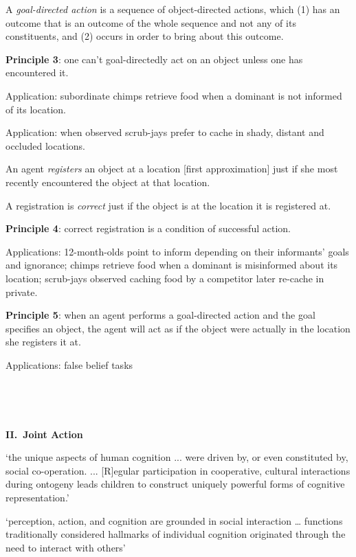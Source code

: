 \documentclass[11pt]{extarticle}
\begin{document}
\begin{multicols}{3}
A \emph{goal-directed action} is a sequence of object-directed actions, which (1) has an outcome that  is an outcome of the whole sequence and not any of its constituents, and (2) occurs in order to bring about this outcome.


\textbf{Principle 3}: one can’t goal-directedly act on an object unless one has encountered it.

Application: subordinate chimps retrieve food when a dominant is not informed of its location.\citep{Hare:2001ph}

Application: when observed scrub-jays prefer to cache in shady, distant and occluded locations.\citep{Dally:2004xf,Clayton:2007fh}

An agent \emph{registers} an object at a location [first approximation] just if she most recently encountered the object at that location.

A registration is \emph{correct} just if the object is at the location it is registered at.

\textbf{Principle 4}: correct registration is a condition of successful action.

Applications: 12-month-olds point to inform depending on their informants’ goals and ignorance;\citep{Liszkowski:2008al} chimps retrieve food when a dominant is misinformed about its location;\citep{Hare:2001ph} scrub-jays observed caching food by a competitor later re-cache in private.\citep{Clayton:2007fh,Emery:2007ze}

 
\textbf{Principle 5}: when an agent performs a goal-directed action and the goal specifies an object, the agent will act as if the object were actually in the location she registers it at.

Applications: false belief tasks \citep{Onishi:2005hm,Southgate:2007js,Buttelmann:2009gy}

\


\ 
\begin{center}
{\Large
\textbf{II.\ Joint Action}
}
\end{center}


`the unique aspects of human cognition ... were driven by, or even constituted by, social co-operation. ...
[R]egular participation in cooperative, cultural interactions during ontogeny leads children to construct uniquely powerful forms of cognitive representation.'
\citep%
{Moll:2007gu}


`perception, action, and cognition are grounded in social interaction
 … functions traditionally considered hallmarks of individual cognition originated through the need to interact with others' \citep%
{Knoblich:2006bn}










\end{multicols}
\end{document}
